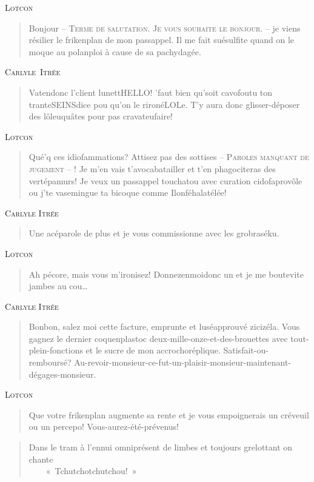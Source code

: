   \textsc{Lotcon}
  \begin{quote}
    Bonjour -- \textsc{Terme de salutation. Je vous souhaite le bonjour.}  -- je viens
    résilier le frikenplan de mon passappel.  Il me fait suésulfite quand on le
    moque au polanploi à cause de sa pachydagée.
  \end{quote}
  \textsc{Carlyle Itrée}
  \begin{quote}
    Vatendonc  l’client  lunettHELLO!  ’faut  bien  qu’soit  cavofoutu  ton
    tranteSEINSdice pou qu’on le  rironéLOLe. T’y aura donc glisser-déposer
    des lôleuquâtes pour pas cravateufaire!
  \end{quote}
  \textsc{Lotcon}
  \begin{quote}
    Qué’q ces idiofammations? Attisez pas des sottises -- \textsc{Paroles manquant de jugement} -- 
    ! Je m’en vais t’avocabatailler et t’en phagociteras des vertépamurs! Je veux un passappel 
    touchatou avec curation cidofaprovôle ou j’te vasemingue ta bicoque comme Ilonféhalatélée!
  \end{quote}
  \textsc{Carlyle Itrée}
  \begin{quote}
    Une acéparole de plus et je vous commissionne avec les grobraséku.
  \end{quote}
  \textsc{Lotcon}
  \begin{quote}
    Ah pécore, mais vous m’ironisez! Donnezenmoidonc un et je me boutevite jambes au cou…
  \end{quote}
  \textsc{Carlyle Itrée}
  \begin{quote}
    Bonbon, salez moi cette facture, emprunte et luséapprouvé zicizéla. Vous gagnez le dernier coquenplastoc
    deux-mille-onze-et-des-brouettes avec tout-plein-fonctions et le sucre de mon accrochoréplique.
    Satisfait-ou-remboursé? Au-revoir-monsieur-ce-fut-un-plaisir-monsieur-maintenant-dégages-monsieur.
  \end{quote}
  \textsc{Lotcon}
  \begin{quote}
    Que votre frikenplan  augmente sa rente et je vous  empoignerais un créveuil
    ou un percepo! Vous-aurez-été-prévenus!
  \end{quote}
  \begin{verse}
    Dans le tram à l’ennui omniprésent de limbes et toujours grelottant on chante\\
    ~~~~«~Tchutchotchutchou!~»\\
  \end{verse}
